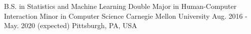 

\begin{cventries}

  \cventry
    {B.S. in Statistics and Machine Learning 
    \linebreak Double Major in Human-Computer Interaction
    \linebreak Minor in Computer Science} %
    {Carnegie Mellon University} %
    {Aug. 2016 - May. 2020 (expected)} %
    {Pittsburgh, PA, USA} %
    {
    }
\vspace{-0.7cm}
\end{cventries}
